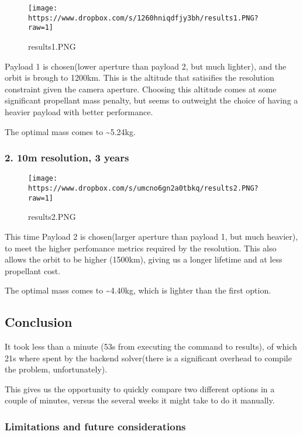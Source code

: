 \documentclass[11pt]{article}
\makeatletter
\def\maxwidth{\ifdim\Gin@nat@width>\linewidth\linewidth
    \else\Gin@nat@width\fi}
\let\Oldincludegraphics\includegraphics
\renewcommand{\includegraphics}[1]{\Oldincludegraphics[width=.8\maxwidth]{#1}}
\makeatother
\begin{document}
\begin{figure}
\centering
\texttt{[image: https://www.dropbox.com/s/1260hniqdfjy3bh/results1.PNG?raw=1]}
\caption{results1.PNG}
\end{figure}

    Payload 1 is chosen(lower aperture than payload 2, but much lighter),
and the orbit is brough to 1200km. This is the altitude that satisifies
the resolution constraint given the camera aperture. Choosing this
altitude comes at some significant propellant mass penalty, but seems to
outweight the choice of having a heavier payload with better
performance.

The optimal mass comes to \textasciitilde{}5.24kg.

    \hypertarget{m-resolution-3-years}{%
\subsubsection{2. 10m resolution, 3 years}\label{m-resolution-3-years}}

\begin{figure}
\centering
\texttt{[image: https://www.dropbox.com/s/umcno6gn2a0tbkq/results2.PNG?raw=1]}
\caption{results2.PNG}
\end{figure}

    This time Payload 2 is chosen(larger aperture than payload 1, but much
heavier), to meet the higher perfomance metrics required by the
resolution. This also allows the orbit to be higher (1500km), giving us
a longer lifetime and at less propellant cost.

The optimal mass comes to \textasciitilde{}4.40kg, which is lighter than
the first option.

    \hypertarget{conclusion}{%
\subsection{Conclusion}\label{conclusion}}

It took less than a minute (53s from executing the command to results),
of which 21s where spent by the backend solver(there is a significant
overhead to compile the problem, unfortunately).

This gives us the opportunity to quickly compare two different options
in a couple of minutes, versus the several weeks it might take to do it
manually.

\hypertarget{limitations-and-future-considerations}{%
\subsubsection{Limitations and future
considerations}\label{limitations-and-future-considerations}}
\end{document}
